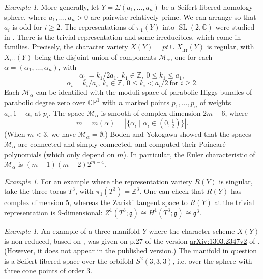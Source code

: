 \documentclass [11pt]{amsart}
\theoremstyle{remark}
\newtheorem {example}[theorem]{Example}
\def\zz {{\mathbb{Z}}}
\def\cc {{\mathbb{C}}}
\def\Z {\zz}
\def\g{\mathfrak{g}}
\def\sl {{\operatorname{SL}(2, \cc)}}
\def\Rep {R}
\def\Char {X}
\def\CharIrr {\Char_{\operatorname{irr}}}
\def\M{\mathcal{M}}
\begin{document}
\begin{example}
\label{ex:Br4}
More generally, let $Y=\Sigma(a_1, \dots, a_n)$ be a Seifert fibered homology sphere, where $a_1, \dots, a_n > 0$ are pairwise relatively prime. We can arrange so that $a_i$ is odd for $i \geq 2$. The representations of $\pi_1(Y)$ into $\sl$ were  studied in \cite[proof of Theorem 2.7]{BodenCurtis}. There is the trivial representation and some irreducibles, which come in families. Precisely, the character variety $\Char(Y) = \mathit{pt} \cup \CharIrr(Y)$ is regular, with $\CharIrr(Y)$ being the disjoint union of components $\M_{\alpha}$, one for each $\alpha=(\alpha_1,\dots, \alpha_n)$, with
$$ \alpha_1 = k_1/2a_1, \ k_1 \in \Z, \ 0 \leq k_1 \leq a_1,$$
$$ \alpha_i = k_i/a_i, \ k_i \in \Z, \ 0 \leq k_i < a_i /2 \ \text{for } i \geq 2.$$
Each $\M_{\alpha}$ can be identified with the moduli space of parabolic Higgs bundles of parabolic degree zero over $\mathbb{CP}^1$ with $n$ marked points $p_1, \dots, p_n$ of weights $a_i, 1-\alpha_i$ at $p_i$. The space $\M_{\alpha}$ is smooth of complex dimension $2m-6$, where
$$ m = m(\alpha) = | \{ \alpha_i \mid \alpha_i \in (0, \tfrac{1}{2}) \} |.$$
(When $m < 3$, we have $\M_{\alpha}=\emptyset.$) Boden and Yokogawa \cite{BodenYokogawa} showed that the spaces $\M_{\alpha}$ are connected and simply connected, and computed their Poincar\'e polynomials (which only depend on $m$). In particular, the Euler characteristic of $\M_{\alpha}$ is $(m-1)(m-2)2^{m-4}$.
\end{example}


\begin{example}
\label{ex:T3}
For an example where the representation variety $\Rep(Y)$ is singular, take the three-torus $T^3$, with $\pi_1(T^3)=\Z^3$. One can check that $\Rep(Y)$ has complex dimension $5$, whereas the Zariski tangent space to $\Rep(Y)$ at the trivial representation is $9$-dimensional: $Z^1(T^3; \g) \cong H^1(T^3; \g) \cong \g^3$.
\end{example}

\begin{example}
An example of a three-manifold $Y$ where the character scheme $\Char(Y)$ is non-reduced, based on  \cite[equation 2.10.4, p.43]{LubotzkyMagid}, was given on p.27 of the version \url{arXiv:1303.2347v2} of \cite{KapovichMillson}. (However, it does not appear in the published version.) The manifold in question is a Seifert fibered space over the orbifold $S^2(3,3,3)$, i.e. over the sphere with three cone points of order $3$.
\end{example}
\end{document}
